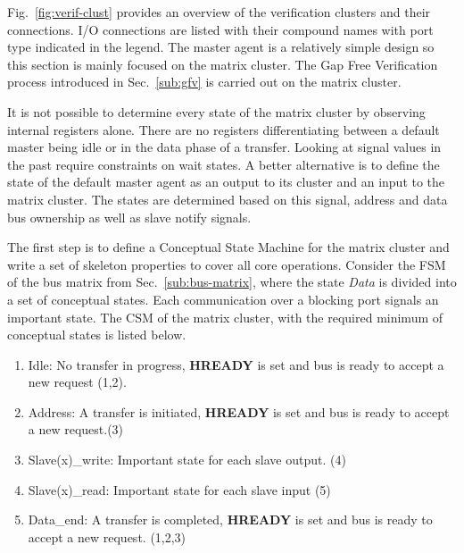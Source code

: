 Fig.~\ref{fig:verif-clust} provides an overview of the verification clusters and their connections. I/O connections are listed with their compound names with port type indicated in the legend. The master agent is a relatively simple design so this section is mainly focused on the matrix cluster. The Gap Free Verification process introduced in Sec.~\ref{sub:gfv} is carried out on the matrix cluster. \par
It is not possible to determine every state of the matrix cluster by observing internal registers alone. There are no registers differentiating between a default master being idle or in the data phase of a transfer. Looking at signal values in the past require constraints on wait states. A better alternative is to define the state of the default master agent as an output to its cluster and an input to the matrix cluster. The states are determined based on this signal, address and data bus ownership as well as slave notify signals. \par
The first step is to define a Conceptual State Machine for the matrix cluster and write a set of skeleton properties to cover all core operations. Consider the FSM of the bus matrix from Sec.~\ref{sub:bus-matrix}, where the state \textit{Data} is divided into a set of conceptual states. Each communication over a blocking port signals an important state. The CSM of the matrix cluster, with the required minimum of conceptual states is listed below.    
 
\begin{enumerate}
 \item Idle: No transfer in progress, \textbf{HREADY} is set and bus is ready to accept a new request (1,2).
 \item Address: A transfer is initiated, \textbf{HREADY} is set and bus is ready to accept a new request.(3)
 \item Slave(x)\_write: Important state for each slave output. (4)
 \item Slave(x)\_read: Important state for each slave input (5)
 \item Data\_end: A transfer is completed, \textbf{HREADY} is set and bus is ready to accept a new request. (1,2,3) 
\end{enumerate}

